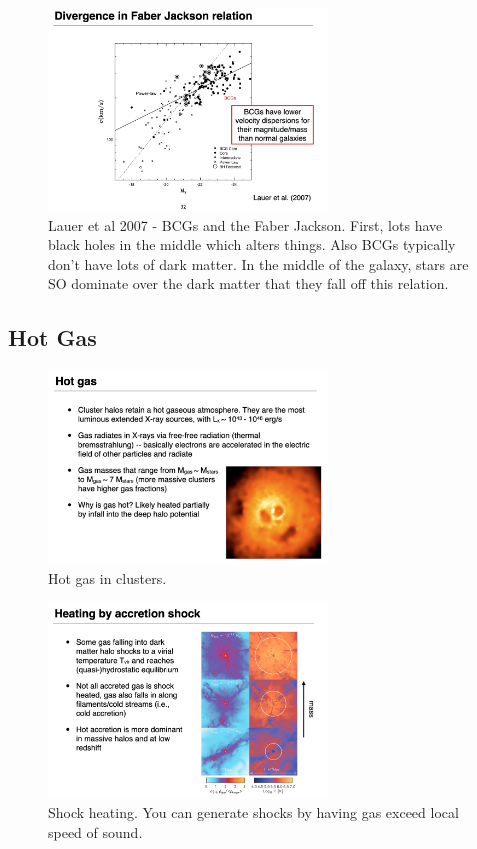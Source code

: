 \documentclass{article}
\begin{document}
\begin{figure}
    \centering
    \includegraphics[width=0.66\textwidth]{figs/Screen Shot 2021-10-29 at 10.55.46 AM.png}
    \caption{Lauer et al 2007 - BCGs and the Faber Jackson. First, lots have black holes in the middle which alters things. Also BCGs typically don't have lots of dark matter. In the middle of the galaxy, stars are SO dominate over the dark matter that they fall off this relation. }
    \label{fig:asdasdasdsaddas1212}
\end{figure}


\subsection{Hot Gas}

\begin{figure}
    \centering
    \includegraphics[width=0.66\textwidth]{figs/Screen Shot 2021-10-29 at 10.58.32 AM.png}
    \caption{Hot gas in clusters. }
    \label{fig:Hot_Gas_inCLusters}
\end{figure}

\begin{figure}
    \centering
    \includegraphics[width=0.66\textwidth]{figs/Screen Shot 2021-10-29 at 10.59.19 AM.png}
    \caption{Shock heating. You can generate shocks by having gas exceed local speed of sound. }
    \label{fig:asdasdasdasdasdaddddddddd}
\end{figure}
\end{document}
